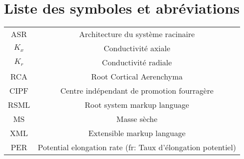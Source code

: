 \newpage
\tableofcontents

\newpage
\listoffigures
{}

\newpage
\listoftables
{}

\newpage
\section*{Liste des symboles et abréviations}

\begin{tabular}{c | c}
ASR & Architecture du système racinaire \\
$K_{x}$ & Conductivité axiale \\
$K_{r}$ & Conductivité radiale \\
RCA & Root Cortical Aerenchyma \\
CIPF & Centre indépendant de promotion fourragère \\
RSML & Root system markup language \\
MS & Masse sèche \\
XML & Extensible markup language \\
PER & Potential elongation rate (fr: Taux d'élongation potentiel)
\end{tabular}

